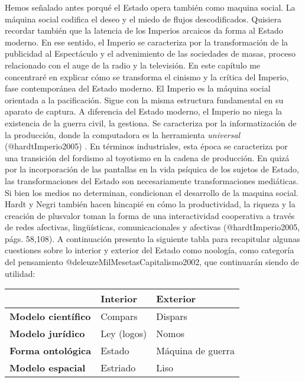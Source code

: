 \documentclass[
]{article}
\begin{document}
Hemos señalado antes porqué el Estado opera también como maquina social.
La máquina social codifica el deseo y el miedo de flujos descodificados.
Quisiera recordar también que la latencia de los Imperios arcaicos da
forma al Estado moderno. En ese sentido, el Imperio se caracteriza por
la transformación de la publicidad al Espectáculo y el advenimiento de
las sociedades de masas, proceso relacionado con el auge de la radio y
la televisión. En este capítulo me concentraré en explicar cómo se
transforma el cinismo y la crítica del Imperio, fase contemporánea del
Estado moderno. El Imperio es la máquina social orientada a la
pacificación. Sigue con la misma estructura fundamental en su aparato de
captura. A diferencia del Estado moderno, el Imperio no niega la
existencia de la guerra civil, la gestiona. Se caracteriza por la
informatización de la producción, donde la computadora es la herramienta
\emph{universal} (@hardtImperio2005) . En términos industriales, esta
época se caracteriza por una transición del fordismo al toyotismo en la
cadena de producción. En quizá por la incorporación de las pantallas en
la vida psíquica de los sujetos de Estado, las transformaciones del
Estado son necesariamente transformaciones mediáticas. Si bien los
medios no determinan, condicionan el desarrollo de la maquina social.
Hardt y Negri también hacen hincapié en cómo la productividad, la
riqueza y la creación de plusvalor toman la forma de una interactividad
cooperativa a través de redes afectivas, lingüísticas, comunicacionales
y afectivas (@hardtImperio2005, págs. 58,108). A continuación presento
la siguiente tabla para recapitular algunas cuestiones sobre lo interior
y exterior del Estado como noología, como categoría del pensamiento
@deleuzeMilMesetasCapitalismo2002, que continuarán siendo de utilidad:

\begin{longtable}[]{@{}lll@{}}
\toprule
& \textbf{Interior} & \textbf{Exterior}\tabularnewline
\midrule
\endhead
\textbf{Modelo científico} & Compars & Dispars\tabularnewline
\textbf{Modelo jurídico} & Ley (logos) & Nomos\tabularnewline
\textbf{Forma ontológica} & Estado & Máquina de guerra\tabularnewline
\textbf{Modelo espacial} & Estriado & Liso\tabularnewline
\bottomrule
\end{longtable}
\end{document}
